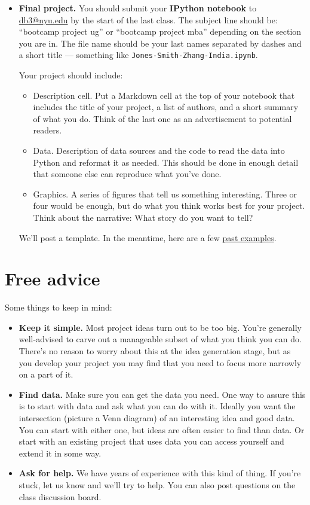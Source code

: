 \documentclass[11pt]{article}
\begin{document}
\begin{itemize}
\item {\bf Final project.}
You should submit your {\bf IPython notebook\/} to \href{mailto:db3@nyu.edu}{db3@nyu.edu}
by the start of the last class.
The subject line should be:  ``bootcamp project ug'' or ``bootcamp project mba''
depending on the section you are in.
The file name should be your last names separated by dashes and a short title ---
something like {\tt Jones-Smith-Zhang-India.ipynb}.

Your project should include:
\begin{itemize}
\item Description cell.  Put a Markdown cell at the top of your notebook that
   includes the title of your project, a list of authors, and a short summary
  of what you do.  Think of the last one as an advertisement to potential readers.
\item Data.  Description of data sources and the code to read the data into Python
and reformat it as needed.
This should be done in enough detail that someone else can reproduce what you've done.
\item Graphics.  A series of figures that tell us something interesting.
Three or four would be enough, but do what you think works best for your project.
Think about the narrative:  What story do you want to tell?
\end{itemize}
We'll post a template.
In the meantime, here are a few \href{https://github.com/DaveBackus/Data_Bootcamp/tree/master/Projects}
{past examples}.
\end{itemize}


\section*{Free advice}

Some things to keep in mind:
%
\begin{itemize}
\item {\bf Keep it simple.}
Most project ideas turn out to be too big.  You're generally well-advised
to carve out a manageable subset of what you think you can do.
There's no reason to worry about this at the idea generation stage,
but as you develop your project you may find that you need to focus
more narrowly on a part of it.

\item {\bf Find data.}  Make sure you can get the data you need.
One way to assure this is to start with data and ask what you can do with it.
Ideally you want the intersection (picture a Venn diagram) of an interesting
idea and good data.  You can start with either one, but ideas are often easier to
find than data.
Or start with an existing project that uses data you can access yourself 
and extend it in some way.


\item {\bf Ask for help.}
We have years of experience with this kind of thing.
If you're stuck, let us know and we'll try to help.
You can also post questions on the class discussion board.

\end{itemize}




\end{document}
